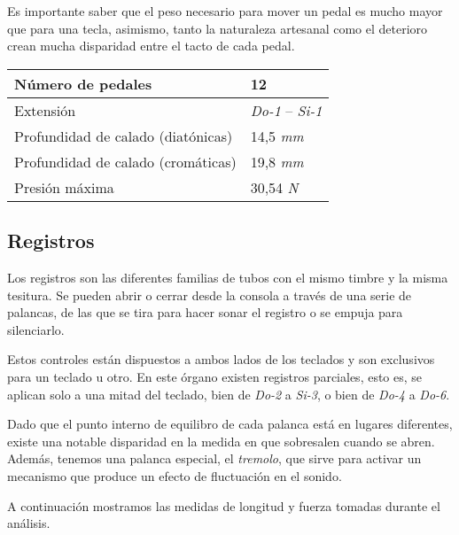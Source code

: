 Es importante saber que el peso necesario para mover un pedal es mucho mayor que para una tecla, asimismo, tanto la naturaleza artesanal como el deterioro crean mucha disparidad entre el tacto de cada pedal.

\begin{center}
	\begin{tabular}{|l|l|}
		\hline Número de pedales & 12 \\ 
		\hline Extensión & \textit{Do-1} -- \textit{Si-1} \\ 
		\hline Profundidad de calado (diatónicas) & 14,5 \textit{mm} \\ 
		\hline Profundidad de calado (cromáticas) & 19,8 \textit{mm} \\
		\hline Presión máxima & 30,54 \textit{N} \\
		\hline 
	\end{tabular} 
\end{center}

\subsection{Registros}

Los registros son las diferentes familias de tubos con el mismo timbre y la misma tesitura. Se pueden abrir o cerrar desde la consola a través de una serie de palancas, de las que se tira para hacer sonar el registro o se empuja para silenciarlo.

Estos controles están dispuestos a ambos lados de los teclados y son exclusivos para un teclado u otro. En este órgano existen registros parciales, esto es, se aplican solo a una mitad del teclado, bien de \textit{Do-2} a \textit{Si-3}, o bien de \textit{Do-4} a \textit{Do-6}.

Dado que el punto interno de equilibro de cada palanca está en lugares diferentes, existe una notable disparidad en la medida en que sobresalen cuando se abren. Además, tenemos una palanca especial, el \textit{tremolo}, que sirve para activar un mecanismo que produce un efecto de fluctuación en el sonido.

A continuación mostramos las medidas de longitud y fuerza tomadas durante el análisis.

